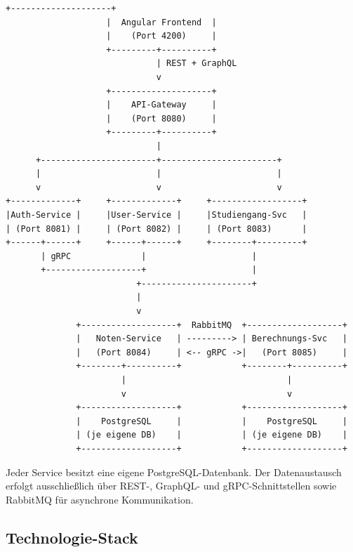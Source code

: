 \documentclass[12pt,a4paper,ngerman]{article}
\begin{document}
\begin{lstlisting}[basicstyle=\ttfamily\footnotesize, columns=fullflexible, keepspaces=true]
                    +--------------------+
                    |  Angular Frontend  |
                    |    (Port 4200)     |
                    +---------+----------+
                              | REST + GraphQL
                              v
                    +--------------------+
                    |    API-Gateway     |
                    |    (Port 8080)     |
                    +---------+----------+
                              |
      +-----------------------+-----------------------+
      |                       |                       |
      v                       v                       v
+-------------+     +-------------+     +------------------+
|Auth-Service |     |User-Service |     |Studiengang-Svc   |
| (Port 8081) |     | (Port 8082) |     | (Port 8083)      |
+------+------+     +------+------+     +--------+---------+
       | gRPC              |                     |
       +-------------------+                     |
                          +----------------------+
                          |
                          v
              +-------------------+  RabbitMQ  +-------------------+
              |   Noten-Service   | ---------> | Berechnungs-Svc   |
              |   (Port 8084)     | <-- gRPC ->|   (Port 8085)     |
              +--------+----------+            +--------+----------+
                       |                                |
                       v                                v
              +-------------------+            +-------------------+
              |    PostgreSQL     |            |    PostgreSQL     |
              | (je eigene DB)    |            | (je eigene DB)    |
              +-------------------+            +-------------------+
\end{lstlisting}

Jeder Service besitzt eine eigene PostgreSQL-Datenbank. Der Datenaustausch erfolgt ausschließlich über REST-, GraphQL- und gRPC-Schnittstellen sowie RabbitMQ für asynchrone Kommunikation.

\subsection{Technologie-Stack}
\end{document}
